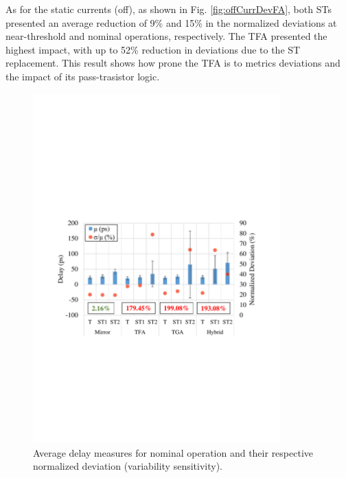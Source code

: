 \documentclass[pgmicro,diss,english]{iiufrgs}
\begin{document}
As for the static currents (off), as shown in Fig. \ref{fig:offCurrDevFA}, both STs presented an average reduction of 9\% and 15\% in the normalized deviations at near-threshold and nominal operations, respectively. The TFA presented the highest impact, with up to 52\% reduction in deviations due to the ST replacement. This result shows how prone the TFA is to metrics deviations and the impact of its pass-trasistor logic.

\begin{figure}[h]
  \centering
    \includegraphics[width=0.85\textwidth, trim={2cm 10cm 2cm 10.5cm}, clip]{averageDelayNominal.pdf}
     \caption{Average delay measures for nominal operation and their respective normalized deviation (variability sensitivity).}
  \label{fig:avgDelayNominal}
\end{figure}

\vspace{-1em}
\end{document}
